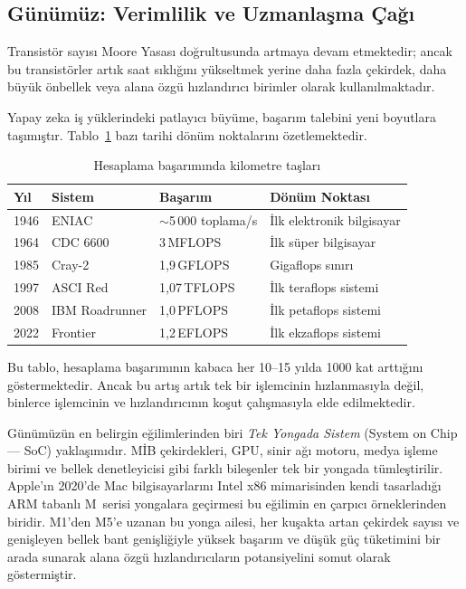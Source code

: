 \subsection{Günümüz: Verimlilik ve Uzmanlaşma Çağı}
\label{subsec:verimlilik-cagi}

Transistör sayısı Moore Yasası doğrultusunda artmaya devam etmektedir; ancak bu transistörler artık saat sıklığını yükseltmek yerine daha fazla çekirdek, daha büyük önbellek veya alana özgü hızlandırıcı birimler olarak kullanılmaktadır.

Yapay zeka iş yüklerindeki patlayıcı büyüme, başarım talebini yeni boyutlara taşımıştır. Tablo~\ref{tab:basarim-kilometre} bazı tarihi dönüm noktalarını özetlemektedir.

\begin{table}[H]
\centering
\caption{Hesaplama başarımında kilometre taşları}
\label{tab:basarim-kilometre}
\small
\begin{tabular}{llll}
\toprule
\textbf{Yıl} & \textbf{Sistem} & \textbf{Başarım} & \textbf{Dönüm Noktası} \\
\midrule
1946 & ENIAC           & $\sim$5\,000 toplama/s & İlk elektronik bilgisayar \\
1964 & CDC 6600        & 3\,MFLOPS         & İlk süper bilgisayar \\
1985 & Cray-2          & 1,9\,GFLOPS       & Gigaflops sınırı \\
1997 & ASCI Red        & 1,07\,TFLOPS      & İlk teraflops sistemi \\
2008 & IBM Roadrunner  & 1,0\,PFLOPS       & İlk petaflops sistemi \\
2022 & Frontier        & 1,2\,EFLOPS       & İlk ekzaflops sistemi \\
\bottomrule
\end{tabular}
\end{table}

Bu tablo, hesaplama başarımının kabaca her 10--15 yılda 1000 kat arttığını göstermektedir. Ancak bu artış artık tek bir işlemcinin hızlanmasıyla değil, binlerce işlemcinin ve hızlandırıcının koşut çalışmasıyla elde edilmektedir.

Günümüzün en belirgin eğilimlerinden biri \emph{Tek Yongada Sistem} (System on Chip --- SoC) yaklaşımıdır. MİB çekirdekleri, GPU, sinir ağı motoru, medya işleme birimi ve bellek denetleyicisi gibi farklı bileşenler tek bir yongada tümleştirilir. Apple'ın 2020'de Mac bilgisayarlarını Intel x86 mimarisinden kendi tasarladığı ARM tabanlı M~serisi yongalara geçirmesi bu eğilimin en çarpıcı örneklerinden biridir. M1'den M5'e uzanan bu yonga ailesi, her kuşakta artan çekirdek sayısı ve genişleyen bellek bant genişliğiyle yüksek başarım ve düşük güç tüketimini bir arada sunarak alana özgü hızlandırıcıların potansiyelini somut olarak göstermiştir.

